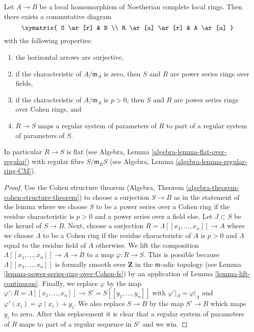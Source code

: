 \begin{lemma}
\label{lemma-embed-map-Noetherian-complete-local-rings}
Let $A \to B$ be a local homomorphism of Noetherian complete local rings.
Then there exists a commutative diagram
$$
\xymatrix{
S \ar[r] & B \\
R \ar[u] \ar[r] & A \ar[u]
}
$$
with the following properties:
\begin{enumerate}
\item the horizontal arrows are surjective,
\item if the characteristic of $A/\mathfrak m_A$ is zero, then $S$ and $R$
are power series rings over fields,
\item if the characteristic of $A/\mathfrak m_A$ is $p > 0$, then $S$ and $R$
are power series rings over Cohen rings, and
\item $R \to S$ maps a regular system of parameters of $R$ to part of a
regular system of parameters of $S$.
\end{enumerate}
In particular $R \to S$ is flat (see Algebra,
Lemma \ref{algebra-lemma-flat-over-regular}) with regular fibre
$S/\mathfrak m_R S$ (see Algebra, Lemma \ref{algebra-lemma-regular-ring-CM}).
\end{lemma}

\begin{proof}
Use the Cohen structure theorem
(Algebra, Theorem \ref{algebra-theorem-cohen-structure-theorem})
to choose a surjection $S \to B$ as in the statement of the lemma
where we choose $S$ to be a power series over a Cohen ring if the
residue characteristic is $p > 0$ and a power series over a field else.
Let $J \subset S$ be the kernel of $S \to B$.
Next, choose a surjection $R = \Lambda[[x_1, \ldots, x_n]] \to A$ where
we choose $\Lambda$ to be a Cohen ring if the residue characteristic of
$A$ is $p > 0$ and $\Lambda$ equal to the residue field of $A$ otherwise.
We lift the composition $\Lambda[[x_1, \ldots, x_n]] \to A \to B$
to a map $\varphi : R \to S$. This is possible because
$\Lambda[[x_1, \ldots, x_n]]$ is formally smooth over $\mathbf{Z}$
in the $\mathfrak m$-adic topology (see
Lemma \ref{lemma-power-series-ring-over-Cohen-fs})
by an application of Lemma \ref{lemma-lift-continuous}.
Finally, we replace $\varphi$ by the map
$\varphi' : R = \Lambda[[x_1, \ldots, x_n]] \to S' = S[[y_1, \ldots, y_n]]$
with $\varphi'|_\Lambda = \varphi|_\Lambda$ and
$\varphi'(x_i) = \varphi(x_i) + y_i$. We also replace $S \to B$
by the map $S' \to B$ which maps $y_i$ to zero. After this replacement
it is clear that a regular system of parameters of $R$ maps to part of a
regular sequence in $S'$ and we win.
\end{proof}

